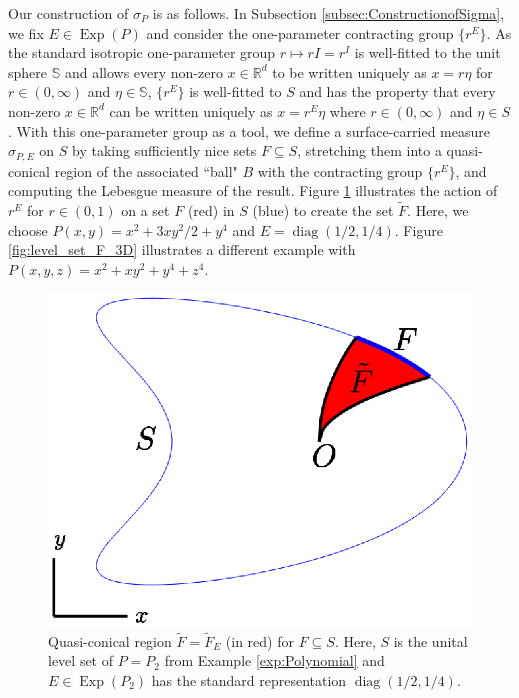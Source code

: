 \documentclass[11pt, letter]{book}
\newcommand\Exp{\operatorname{Exp}}
\newcommand\diag{\operatorname{diag}}
\begin{document}
\noindent Our construction of $\sigma_P$ is as follows. In Subsection \ref{subsec:ConstructionofSigma}, we fix $E\in\Exp(P)$ and consider the one-parameter contracting group $\{r^E\}$. As the standard isotropic one-parameter group $r\mapsto rI=r^I$ is well-fitted to the unit sphere $\mathbb{S}$ and allows every non-zero $x\in\mathbb{R}^d$ to be written uniquely as $x=r\eta$ for $r\in (0,\infty)$ and $\eta\in \mathbb{S}$, $\{r^E\}$ is well-fitted to $S$ and has the property that every non-zero $x\in\mathbb{R}^d$ can be written uniquely as $x=r^E\eta$ where $r\in(0,\infty)$ and $\eta\in S$. With this one-parameter group as a tool, we define a surface-carried measure $\sigma_{P,E}$ on $S$ by taking sufficiently nice sets $F\subseteq S$, stretching them into a quasi-conical region of the associated ``ball" $B$ with the contracting group $\{r^E\}$, and computing the Lebesgue measure of the result. Figure \ref{fig:level_set_F} illustrates the action of $r^E$ for $r\in (0,1)$ on a set $F$ (red) in $S$ (blue) to create the set $\widetilde{F}$. Here, we choose $P(x,y) = x^2 + 3xy^2/2 + y^4$ and $E= \diag(1/2, 1/4)$. Figure \ref{fig:level_set_F_3D} illustrates a different example with $P(x,y,z) = x^2 + xy^2 + y^4 + z^4$.

\begin{figure}[!htb]
    \centering
    \includegraphics[scale=0.7, trim={1cm 1cm 1cm 0.5cm},clip]{Fig3.eps}
    \caption{Quasi-conical region $\widetilde{F}=\widetilde{F}_E$ (in red) for $F\subseteq S$. Here, $S$ is the unital level set of $P=P_2$ from Example \ref{exp:Polynomial} and $E\in\Exp(P_2)$ has the standard representation $\diag(1/2,1/4)$.}
    \label{fig:level_set_F}
\end{figure}
\end{document}
